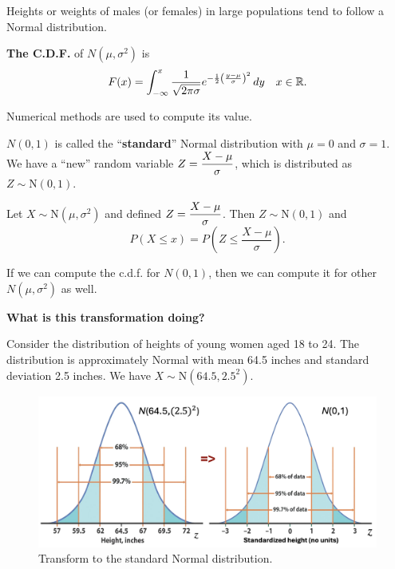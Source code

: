  \begin{example}
    Heights or weights of males (or females) in large populations tend to follow a Normal distribution.
 \end{example}

 \textbf{The C.D.F.} of $N(\mu,\sigma^2)$ is
 \[
    F(x) = \int_{-\infty}^{x} \frac{1}{\sqrt{2\pi\sigma}} e^{-\frac{1}{2}\left(\frac{y-\mu}{\sigma}\right)^2} \, dy \quad x \in {\mathbb{R}}.
\]

\begin{note}
    Numerical methods are used to compute its value. 
\end{note}

$N(0,1)$ is called the ``\textbf{standard}'' Normal distribution with $\mu = 0$ and $\sigma = 1$. We have a ``new'' random variable $Z = \displaystyle \frac{X - \mu}{\sigma}$, which is distributed as $Z \sim \text{N}(0,1)$.

\begin{theorem}
    Let $X \sim \text{N}(\mu,\sigma^2)$ and defined $Z = \displaystyle \frac{X - \mu}{\sigma}$. Then $Z \sim \text{N}(0,1)$ and
    \[
        P(X \leq x) = P \left( Z \leq \frac{X - \mu}{\sigma} \right).
    \]
\end{theorem}

\begin{note}
    If we can compute the c.d.f. for $N(0,1)$, then we can compute it for other $N(\mu,\sigma^2)$ as well.
\end{note}

\textbf{What is this transformation doing?}

Consider the distribution of heights of young women aged 18 to 24. The distribution is approximately Normal with mean 64.5 inches and standard deviation 2.5 inches. We have $X \sim \text{N}(64.5,2.5^2)$.

\begin{figure}[htbp]
    \center
    \includegraphics[scale=0.3]{img/Z-distribution.png}
    \caption{Transform to the standard Normal distribution.}
\end{figure}

